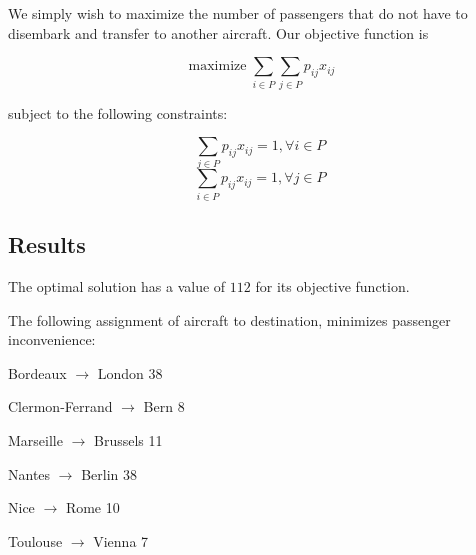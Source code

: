 \documentclass[11pt,oneside]{article}
\DeclareMathOperator*{\maximize}{maximize}
\begin{document}
We simply wish to maximize the number of passengers that do not have to disembark
and transfer to another aircraft. Our objective function is

$$
\maximize \sum_{i\in P}\sum_{j\in P} p_{ij}x_{ij}
$$

subject to the following constraints:

$$
\sum_{j\in P}p_{ij} x_{ij} = 1, \forall i\in P
$$
$$
\sum_{i\in P}p_{ij} x_{ij} = 1, \forall j\in P
$$

\subsection{Results}

The optimal solution has a value of $112$ for its objective function.

The following assignment of aircraft to destination, minimizes passenger
inconvenience:

Bordeaux $\rightarrow$ London 38

Clermon-Ferrand $\rightarrow$ Bern 8

Marseille $\rightarrow$ Brussels 11

Nantes $\rightarrow$ Berlin 38

Nice $\rightarrow$ Rome 10

Toulouse $\rightarrow$ Vienna 7
\end{document}
